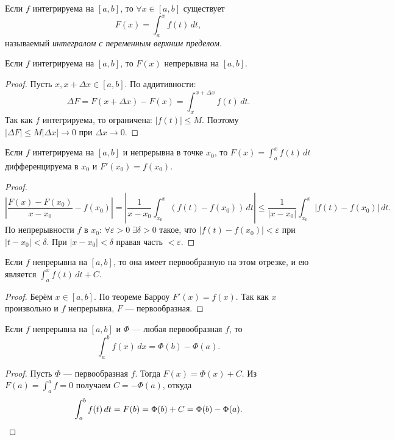 
\begin{defn}
  Если $f$ интегрируема на $[a,b]$, то $\forall x \in [a,b]$ существует
  \[
    F(x) = \int_a^x f(t)\,dt,
  \]
  называемый \emph{интегралом с переменным верхним пределом}.
\end{defn}

\begin{theorem}[Непрерывность]
  Если $f$ интегрируема на $[a,b]$, то $F(x)$ непрерывна на $[a,b]$.
  \begin{proof}
    Пусть $x, x+\Delta x \in [a,b]$. По аддитивности:
    \[
      \Delta F = F(x+\Delta x) - F(x) = \int_x^{x+\Delta x} f(t)\,dt.
    \]
    Так как $f$ интегрируема, то ограничена: $|f(t)| \leq M$.
    Поэтому $|\Delta F| \leq M|\Delta x| \to 0$ при $\Delta x \to 0$. \qedhere
  \end{proof}
\end{theorem}

\begin{theorem}
  Если $f$ интегрируема на $[a,b]$ и непрерывна в точке $x_0$, то
  $F(x) = \int_a^x f(t)\,dt$ дифференцируема в $x_0$ и $F'(x_0) = f(x_0)$.
  \begin{proof}
    \[
      \left|\frac{F(x) - F(x_0)}{x - x_0} - f(x_0)\right|
      = \left|\frac{1}{x-x_0}\int_{x_0}^{x}(f(t) - f(x_0))\,dt\right|
      \leq \frac{1}{|x-x_0|}\int_{x_0}^x |f(t)-f(x_0)|\,dt.
    \]
    По непрерывности $f$ в $x_0$: $\forall\varepsilon>0\;\exists\delta>0$ такое, что
    $|f(t)-f(x_0)| < \varepsilon$ при $|t-x_0|<\delta$.
    При $|x-x_0|<\delta$ правая часть $< \varepsilon$. \qedhere
  \end{proof}
\end{theorem}

\begin{theorem}
  Если $f$ непрерывна на $[a,b]$, то она имеет первообразную на этом отрезке,
  и ею является $\int_a^x f(t)\,dt + C$.
  \begin{proof}
    Берём $x \in [a,b]$. По теореме Барроу $F'(x) = f(x)$.
    Так как $x$ произвольно и $f$ непрерывна, $F$ --- первообразная. \qedhere
  \end{proof}
\end{theorem}

\begin{theorem}
  Если $f$ непрерывна на $[a,b]$ и $\Phi$ --- любая первообразная $f$, то
  \[
    \int_a^b f(x)\,dx = \Phi(b) - \Phi(a).
  \]
  \begin{proof}
    Пусть $\Phi$ --- первообразная $f$. Тогда $F(x) = \Phi(x) + C$.
    Из $F(a) = \int_a^a f = 0$ получаем $C = -\Phi(a)$, откуда
    \[
      \int_a^b f(t)\,dt = F(b) = \Phi(b) + C = \Phi(b) - \Phi(a). \qedhere
    \]
  \end{proof}
\end{theorem}
